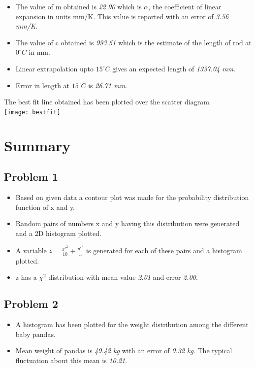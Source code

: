 \documentclass{extarticle}
\begin{document}
		
		
		\begin{itemize}
		\item The value of m obtained is \emph{22.90} which is $ \alpha $, the coefficient of linear expansion in units mm/K. This 				value is reported with an error of \emph{3.56 mm/K}.
		\item The value of c obtained is \emph{993.51} which is the estimate of the length of rod at $ 0^{\circ}C $ in mm.
		\item Linear extrapolation upto $ 15^{\circ}C $ gives an expected length of \emph{1337.04 mm}.
		\item Error in length at $ 15^{\circ}C $ is \emph{26.71 mm}.
		\end{itemize}
		
		\newpage
		The best fit line obtained has been plotted over the scatter diagram. \\ 		
		\texttt{[image: bestfit]} \\


		\newpage

	\section{\color{Blue} Summary}
		\subsection{\color{MidnightBlue} Problem 1}
		\begin{itemize}
		\item Based on given data a contour plot was made for the probability distribution function of x and y.
		\item Random pairs of numbers x and y having this distribution were generated and a 2D histogram plotted.
		\item A variable $ z = \frac{{x'}^2}{10} + \frac{{y'}^2}{5} $ is generated for each of these pairs and a histogram plotted.
		\item z has a $ \chi ^{2} $ distribution with mean value \emph{2.01} and error \emph{2.00}.
		\end{itemize}
		
		\subsection{\color{MidnightBlue} Problem 2}
		\begin{itemize}
		\item A histogram has been plotted for the weight distribution among the different baby pandas.
		\item Mean weight of pandas is \emph{49.42 kg} with an error of \emph{0.32 kg}. The typical 					fluctuation about this mean is \emph{10.21}.
		\end{itemize}
		
\end{document}

